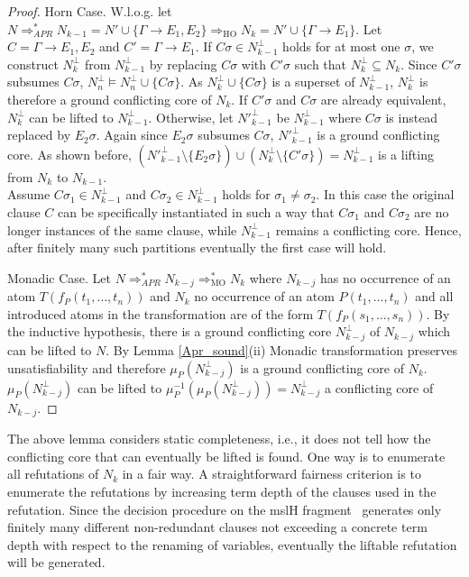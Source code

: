 \documentclass{llncs}
\newcommand{\sat}{\vDash}
\newcommand{\imp}{\rightarrow}
\newcommand{\R}[1]{\mu^{-1}_{#1}}
\newcommand{\Proj}[1]{\mu_{#1}}
\newcommand{\apr}{ \Rightarrow_{APR}}
\begin{document}
\begin{proof}
Horn Case. W.l.o.g. let $N\apr^*  N_{k-1}=N'\cup\{\Gamma \imp E_1,E_2\} \Rightarrow_{\text{HO}} N_{k}= N'\cup\{\Gamma \imp E_1\}$.
Let $C = \Gamma \imp E_1 ,E_2$ and $C' = \Gamma \imp E_1$.
If $C\sigma \in N^\bot_{k-1}$ holds for at most one $\sigma$, we construct $N^\bot_{k}$ from $N^\bot_{k-1}$ by replacing $C\sigma$ with $C'\sigma$ such that $N^\bot_{k}\subseteq N_k$.
Since $C'\sigma$ subsumes $C\sigma$, $N^\bot_{n} \sat N^\bot_{n}\cup\{C\sigma\}$.
As $N^\bot_{k}\cup\{C\sigma\}$ is a superset of $N^\bot_{k-1}$, $N^\bot_{k}$ is therefore a ground conflicting core of $N_k$.
If $C'\sigma$ and $C\sigma$ are already equivalent,  $N^\bot_{k}$ can be lifted to $N^\bot_{k-1}$.
Otherwise, let $N'^\bot_{k-1}$ be $N^\bot_{k-1}$ where  $C\sigma$  is instead replaced by $E_2\sigma$.
Again since $E_2\sigma$ subsumes $C\sigma$, $N'^\bot_{k-1}$ is a ground conflicting core. 
As shown before, $(N'^\bot_{k-1}\setminus\{E_2\sigma\})\cup (N^\bot_{k}\setminus\{C'\sigma\})=N^\bot_{k-1}$ is a lifting from $N_k$ to $N_{k-1}$.\\
Assume $C\sigma_1 \in N^\bot_{k-1}$ and $C\sigma_2 \in N^\bot_{k-1}$ holds for $\sigma_1\neq \sigma_2$. 
In this case the original clause $C$ can be specifically instantiated in such a way that $C\sigma_1$ and $C\sigma_2$ are no longer instances of the same clause,
while $N^\bot_{k-1}$ remains a conflicting core.
Hence, after finitely many such partitions eventually the first case will hold. 

Monadic Case. Let $N\apr^* N_{k-j} \Rightarrow^*_{\text{MO}} N_k$ where $N_{k-j}$ has no occurrence of an atom 
$T(f_P(t_1,\dots,t_n))$ and $N_{k}$ no occurrence of an atom $P(t_1,\dots,t_n)$ and
all introduced atoms in the transformation are of the form $T(f_P(s_1,\dots,s_n))$.
By the inductive hypothesis, there is a ground conflicting core  $N^\bot_{k-j}$ of $N_{k-j}$ which can be lifted to $N$.
By Lemma \ref{Apr_sound}(ii) Monadic transformation  preserves unsatisfiability and therefore $\Proj{P}(N^\bot_{k-j})$ is a ground conflicting core of $N_{k}$. 
$\Proj{P}(N^\bot_{k-j})$ can be lifted to $\R{P}(\Proj{P}(N^\bot_{k-j}))=N^\bot_{k-j}$ a conflicting core of $N_{k-j}$.
\end{proof}

The above lemma considers static completeness, i.e., it does not tell how the conflicting
core that can eventually be lifted is found. One way is to enumerate all refutations of  $N_k$
in a fair way. A straightforward fairness criterion is to enumerate the refutations by increasing
term depth of the clauses used in the refutation. Since the decision procedure on the
mslH fragment~\cite{Weidenbach99cade} generates only finitely many different
non-redundant clauses not exceeding a concrete term depth with respect to the renaming of variables, eventually the 
liftable refutation will be generated.
\end{document}
